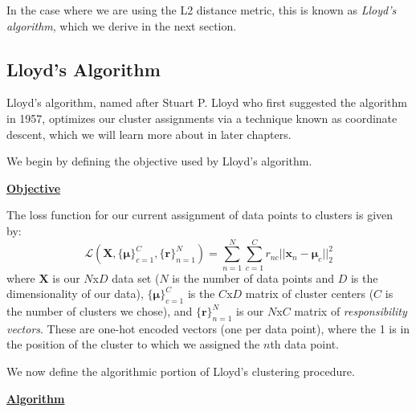 In the case where we are using the L2 distance metric, this is known as \textit{Lloyd's algorithm}, which we derive in the next section.

\subsection{Lloyd's Algorithm}
Lloyd's algorithm, named after Stuart P. Lloyd who first suggested the algorithm in 1957, optimizes our cluster assignments via a technique known as coordinate descent, which we will learn more about in later chapters.

\begin{derivation}
	We begin by defining the objective used by Lloyd's algorithm.

	\underline{\textbf{Objective}}

	The loss function for our current assignment of data points to clusters is given by:
	\begin{equation} \label{clustering-loss-fn}
		\mathcal{L}(\textbf{X}, \big\{\boldsymbol{\mu}\big\}_{c=1}^{C}, \big\{\textbf{r}\big\}_{n=1}^{N}) = \sum_{n=1}^{N} \sum_{c=1}^{C} r_{nc} ||\textbf{x}_{n} - \boldsymbol{\mu}_{c}||_2^{2}
	\end{equation}
	where $\textbf{X}$ is our $N$x$D$ data set ($N$ is the number of data points and $D$ is the dimensionality of our data), $\big\{\boldsymbol{\mu}\big\}_{c=1}^{C}$ is the $C$x$D$ matrix of cluster centers ($C$ is the number of clusters we chose), and $\big\{\textbf{r}\big\}_{n=1}^{N}$ is our $N$x$C$ matrix of \textit{responsibility vectors}. These are one-hot encoded vectors (one per data point), where the 1 is in the position of the cluster to which we assigned the $n$th data point. \newline

	We now define the algorithmic portion of Lloyd's clustering procedure.

	\underline{\textbf{Algorithm}}
	

\end{derivation}

